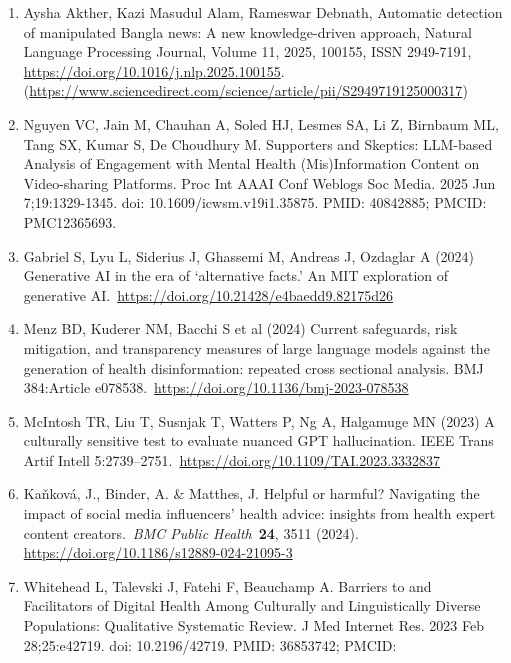 \documentclass[]{article}
\begin{document}
\begin{enumerate}
{  Linguistic Horizons: Fine-tuning and Comprehensive Evaluation of
  Vietnamese Large Language Models}. In~\emph{Findings of the
  Association for Computational Linguistics: NAACL 2024}, pages
  2849--2900, Mexico City, Mexico. Association for Computational
  Linguistics.
\item
  Aysha Akther, Kazi Masudul Alam, Rameswar Debnath, Automatic detection
  of manipulated Bangla news: A new knowledge-driven approach, Natural
  Language Processing Journal, Volume 11, 2025, 100155, ISSN 2949-7191,
  \url{https://doi.org/10.1016/j.nlp.2025.100155}.
  (\url{https://www.sciencedirect.com/science/article/pii/S2949719125000317})
\item
  Nguyen VC, Jain M, Chauhan A, Soled HJ, Lesmes SA, Li Z, Birnbaum ML,
  Tang SX, Kumar S, De Choudhury M. Supporters and Skeptics: LLM-based
  Analysis of Engagement with Mental Health (Mis)Information Content on
  Video-sharing Platforms. Proc Int AAAI Conf Weblogs Soc Media. 2025
  Jun 7;19:1329-1345. doi: 10.1609/icwsm.v19i1.35875. PMID: 40842885;
  PMCID: PMC12365693.
\item
  Gabriel S, Lyu L, Siderius J, Ghassemi M, Andreas J, Ozdaglar A (2024)
  Generative AI in the era of `alternative facts.' An MIT exploration of
  generative AI.~\url{https://doi.org/10.21428/e4baedd9.82175d26}
\item
  Menz BD, Kuderer NM, Bacchi S et al (2024) Current safeguards, risk
  mitigation, and transparency measures of large language models against
  the generation of health disinformation: repeated cross sectional
  analysis. BMJ 384:Article
  e078538.~\url{https://doi.org/10.1136/bmj-2023-078538}
\item
  McIntosh TR, Liu T, Susnjak T, Watters P, Ng A, Halgamuge MN (2023) A
  culturally sensitive test to evaluate nuanced GPT hallucination. IEEE
  Trans Artif Intell
  5:2739--2751.~\url{https://doi.org/10.1109/TAI.2023.3332837}
\item
  Kaňková, J., Binder, A. \& Matthes, J. Helpful or harmful? Navigating
  the impact of social media influencers' health advice: insights from
  health expert content creators.~\emph{BMC Public Health}~\textbf{24},
  3511 (2024). \url{https://doi.org/10.1186/s12889-024-21095-3}
\item
  Whitehead L, Talevski J, Fatehi F, Beauchamp A. Barriers to and
  Facilitators of Digital Health Among Culturally and Linguistically
  Diverse Populations: Qualitative Systematic Review. J Med Internet
  Res. 2023 Feb 28;25:e42719. doi: 10.2196/42719. PMID: 36853742; PMCID:

\end{enumerate}
\end{document}
